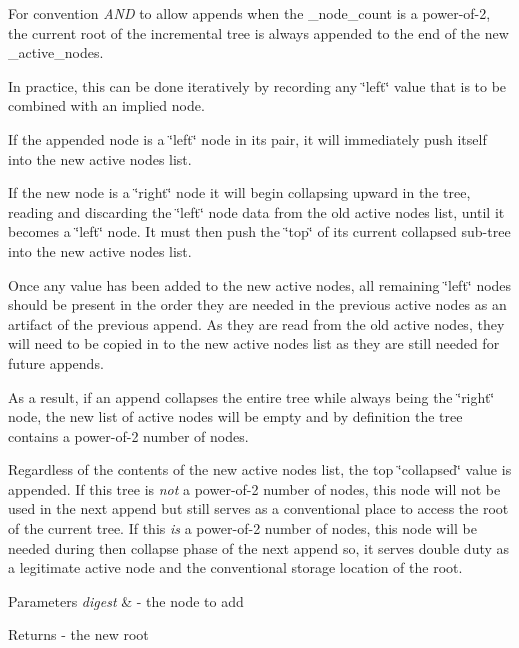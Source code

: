 For convention {\itshape A\+ND} to allow appends when the \+\_\+node\+\_\+count is a power-\/of-\/2, the current root of the incremental tree is always appended to the end of the new \+\_\+active\+\_\+nodes.

In practice, this can be done iteratively by recording any \char`\"{}left\char`\"{} value that is to be combined with an implied node.

If the appended node is a \char`\"{}left\char`\"{} node in its pair, it will immediately push itself into the new active nodes list.

If the new node is a \char`\"{}right\char`\"{} node it will begin collapsing upward in the tree, reading and discarding the \char`\"{}left\char`\"{} node data from the old active nodes list, until it becomes a \char`\"{}left\char`\"{} node. It must then push the \char`\"{}top\char`\"{} of its current collapsed sub-\/tree into the new active nodes list.

Once any value has been added to the new active nodes, all remaining \char`\"{}left\char`\"{} nodes should be present in the order they are needed in the previous active nodes as an artifact of the previous append. As they are read from the old active nodes, they will need to be copied in to the new active nodes list as they are still needed for future appends.

As a result, if an append collapses the entire tree while always being the \char`\"{}right\char`\"{} node, the new list of active nodes will be empty and by definition the tree contains a power-\/of-\/2 number of nodes.

Regardless of the contents of the new active nodes list, the top \char`\"{}collapsed\char`\"{} value is appended. If this tree is {\itshape not} a power-\/of-\/2 number of nodes, this node will not be used in the next append but still serves as a conventional place to access the root of the current tree. If this {\itshape is} a power-\/of-\/2 number of nodes, this node will be needed during then collapse phase of the next append so, it serves double duty as a legitimate active node and the conventional storage location of the root.


\begin{DoxyParams}{Parameters}
{\em digest} & -\/ the node to add \\
\hline
\end{DoxyParams}
\begin{DoxyReturn}{Returns}
-\/ the new root 
\end{DoxyReturn}
\mbox{\label{classaacio_1_1chain_1_1incremental__merkle__impl_af3229013b3881f00e079636355ff2491}} 
